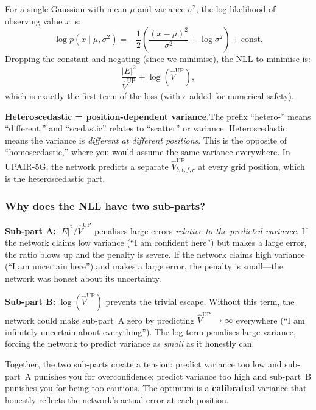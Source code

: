 \documentclass[11pt,a4paper]{article}
\begin{document}
	For a single Gaussian with mean $\mu$ and variance $\sigma^2$, the log-likelihood of observing value $x$ is:
	\begin{equation}
		\log p(x \mid \mu, \sigma^2) = -\frac{1}{2}\left(\frac{(x - \mu)^2}{\sigma^2} + \log \sigma^2\right) + \mathrm{const}.
		\label{eq:gaussian_nll}
	\end{equation}
	Dropping the constant and negating (since we minimise), the NLL to minimise is:
	\begin{equation}
		\frac{|E|^2}{\widehat{V}^{\mathrm{UP}}} + \log(\widehat{V}^{\mathrm{UP}}),
	\end{equation}
	which is exactly the first term of the loss (with $\epsilon$ added for numerical safety).
	
	\textbf{Heteroscedastic = position-dependent variance.}\quad The prefix ``hetero-'' means ``different,'' and ``scedastic'' relates to ``scatter'' or variance.  Heteroscedastic means the variance is \emph{different at different positions}.  This is the opposite of ``homoscedastic,'' where you would assume the same variance everywhere.  In UPAIR-5G, the network predicts a separate $\widehat{V}^{\mathrm{UP}}_{b,t,f,r}$ at every grid position, which is the heteroscedastic part.
	
	\subsubsection*{Why does the NLL have two sub-parts?}
	
	\textbf{Sub-part A:} $|E|^2 / \widehat{V}^{\mathrm{UP}}$ penalises large errors \emph{relative to the predicted variance}.  If the network claims low variance (``I am confident here'') but makes a large error, the ratio blows up and the penalty is severe.  If the network claims high variance (``I am uncertain here'') and makes a large error, the penalty is small---the network was honest about its uncertainty.
	
	\textbf{Sub-part B:} $\log(\widehat{V}^{\mathrm{UP}})$ prevents the trivial escape.  Without this term, the network could make sub-part~A zero by predicting $\widehat{V}^{\mathrm{UP}} \to \infty$ everywhere (``I am infinitely uncertain about everything'').  The log term penalises large variance, forcing the network to predict variance as \emph{small} as it honestly can.
	
	Together, the two sub-parts create a tension: predict variance too low and sub-part~A punishes you for overconfidence; predict variance too high and sub-part~B punishes you for being too cautious.  The optimum is a \textbf{calibrated} variance that honestly reflects the network's actual error at each position.
	
\end{document}
